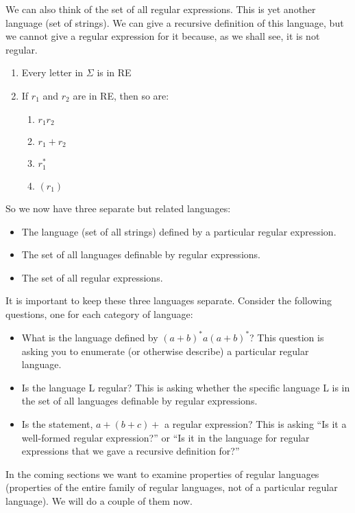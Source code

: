 \documentclass[letterpaper,12pt,openany,reqno]{book}%
\begin{document}
We can also think of the set of all regular expressions. This is yet another language (set of strings). We can give a recursive definition of this language, but we cannot give a regular expression for it because, as we shall see, it is not regular.

\begin{enumerate}
\item Every letter in $\Sigma$ is in RE
\item If $r_1$ and $r_2$ are in RE, then so are:
\begin{enumerate}
\item $r_1 r_2$
\item $r_1 + r_2$
\item $r_1^*$
\item $(r_1)$
\end{enumerate}
\end{enumerate}

So we now have three separate but related languages:
\begin{itemize}
\item The language (set of all strings) defined by a particular regular expression.
\item The set of all languages definable by regular expressions.
\item The set of all regular expressions.
\end{itemize}

It is important to keep these three languages separate. Consider the following questions, one for each category of language:
\begin{itemize}
\item What is the language defined by $(a + b)^*a(a + b)^*$? This question is asking you to enumerate (or otherwise describe) a particular regular language.
\item Is the language L regular? This is asking whether the specific language L is in the set of all languages definable by regular expressions.
\item Is the statement, $a + (b + c)+$ a regular expression? This is asking ``Is it a well-formed regular expression?'' or ``Is it in the language for regular expressions that we gave a recursive definition for?''
\end{itemize}

In the coming sections we want to examine properties of regular languages (properties of the entire family of regular languages, not of a particular regular language). We will do a couple of them now.
\end{document}
